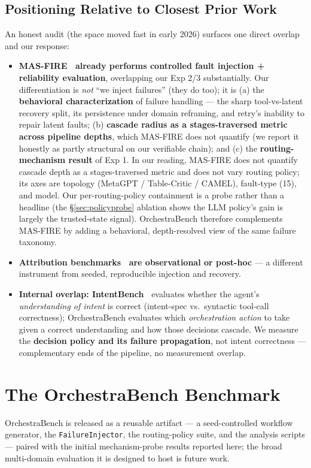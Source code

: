 \documentclass[sigconf,nonacm,anonymous]{acmart}  %
\begin{document}
\subsection{Positioning Relative to Closest Prior Work}
\label{sec:novelty}
An honest audit (the space moved fast in early 2026) surfaces one direct overlap
and our response:
\begin{itemize}
  \item \textbf{MAS-FIRE~\cite{masfire} already performs controlled fault
  injection + reliability evaluation}, overlapping our Exp 2/3 substantially. Our
  differentiation is \emph{not} ``we inject failures'' (they do too); it is (a)
  the \textbf{behavioral characterization} of failure handling --- the sharp
  tool-vs-latent recovery split, its persistence under domain reframing, and
  retry's inability to repair latent faults; (b) \textbf{cascade radius as a
  stages-traversed metric across pipeline depths}, which MAS-FIRE does not
  quantify (we report it honestly as partly structural on our verifiable chain);
  and (c) the \textbf{routing-mechanism result} of Exp 1. In our reading,
  MAS-FIRE does not quantify cascade depth as a stages-traversed metric and does
  not vary routing policy; its axes are topology (MetaGPT / Table-Critic /
  CAMEL), fault-type (15), and model. Our per-routing-policy containment is a
  probe rather than a headline (the \S\ref{sec:policyprobe} ablation shows the LLM policy's gain is
  largely the trusted-state signal). OrchestraBench therefore complements
  MAS-FIRE by adding a behavioral, depth-resolved view of the same failure
  taxonomy.
  \item \textbf{Attribution benchmarks~\cite{traceelephant,attribution} are
  observational or post-hoc} --- a different instrument from seeded,
  reproducible injection and recovery.
  \item \textbf{Internal overlap: IntentBench~\cite{intentbench}} evaluates
  whether the agent's \emph{understanding of intent} is correct (intent-spec vs.\
  syntactic tool-call correctness); OrchestraBench evaluates which
  \emph{orchestration action} to take given a correct understanding and how those
  decisions cascade. We measure the \textbf{decision policy and its failure
  propagation}, not intent correctness --- complementary ends of the pipeline,
  no measurement overlap.
\end{itemize}

\section{The OrchestraBench Benchmark}
OrchestraBench is released as a reusable artifact --- a seed-controlled workflow
generator, the \texttt{FailureInjector}, the routing-policy suite, and the
analysis scripts --- paired with the initial mechanism-probe results reported
here; the broad multi-domain evaluation it is designed to host is future work.
\end{document}
